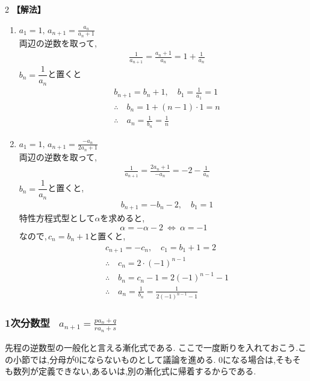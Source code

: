 \documentclass[dvipdfmx,a4paper,11pt,fleqn,openany]{jsbook}
\begin{document}
\begin{multicols*}{2}
      \noindent\textbf{【解法】}
      \begin{enumerate}[label=(\arabic*),parsep=3pt]
        \item $\displaystyle a_1=1,\, a_{n+1}=\frac{a_n}{a_n+1}$\\
              両辺の逆数を取って,
              \begin{align*}
                &\frac{1}{a_{n+1}}=\frac{a_n+1}{a_n}=1+\frac{1}{a_n}
              \end{align*}
              $b_n=\dfrac{1}{a_n}$と置くと
              \begin{align*}
                &b_{n+1}=b_n+1,\quad b_1=\frac{1}{a_1}=1\\
                &\therefore \quad b_n=1+(n-1)\cdot1=n\\
                &\therefore \quad a_n=\frac{1}{b_n}=\frac{1}{n}
              \end{align*}
        \item $\displaystyle a_1=1,\, a_{n+1}=\frac{-a_n}{2a_n+1}$\\
              両辺の逆数を取って,
              \begin{align*}
                &\frac{1}{a_{n+1}}=\frac{2a_n+1}{-a_n}=-2-\frac{1}{a_n}
              \end{align*}
              $b_n=\dfrac{1}{a_n}$と置くと,
              \begin{align*}
                &b_{n+1}=-b_n-2,\quad b_1=1
              \end{align*}
              特性方程式型として$\alpha$を求めると,
              \[
                \alpha=-\alpha-2 \ \Leftrightarrow\ \alpha=-1
              \]
              なので,\,$c_n=b_n+1$と置くと,
              \begin{align*}
                &c_{n+1}=-c_n,\quad c_1=b_1+1=2\\
                &\therefore \quad c_n=2\cdot(-1)^{n-1}\\
                &\therefore \quad b_n=c_n-1=2(-1)^{n-1}-1\\
                &\therefore \quad a_n=\frac{1}{b_n}=\frac{1}{2(-1)^{n-1}-1}
              \end{align*}
      \end{enumerate}
    \subsubsection{1次分数型 \, $\displaystyle a_{n+1}=\frac{pa_n+q}{ra_n+s}$}
      先程の逆数型の一般化と言える漸化式である.
      ここで一度断りを入れておこう.この小節では,分母が0にならないものとして議論を進める.
      0になる場合は,そもそも数列が定義できない,あるいは,別の漸化式に帰着するからである.


\end{multicols*}
\end{document}
